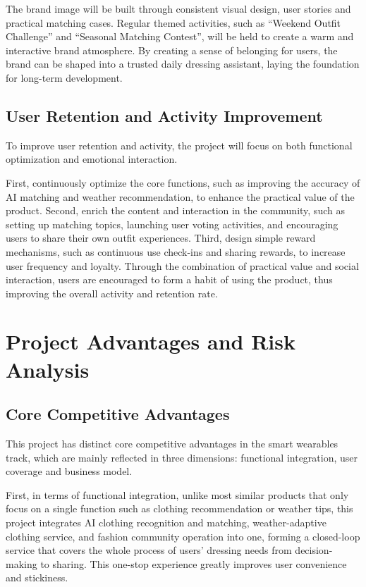 \documentclass[12pt,a4paper]{article}
\begin{document}
The brand image will be built through consistent visual design, user stories and practical matching cases. Regular themed activities, such as “Weekend Outfit Challenge” and “Seasonal Matching Contest”, will be held to create a warm and interactive brand atmosphere. By creating a sense of belonging for users, the brand can be shaped into a trusted daily dressing assistant, laying the foundation for long-term development.

\subsection{User Retention and Activity Improvement}
To improve user retention and activity, the project will focus on both functional optimization and emotional interaction.

First, continuously optimize the core functions, such as improving the accuracy of AI matching and weather recommendation, to enhance the practical value of the product. Second, enrich the content and interaction in the community, such as setting up matching topics, launching user voting activities, and encouraging users to share their own outfit experiences. Third, design simple reward mechanisms, such as continuous use check-ins and sharing rewards, to increase user frequency and loyalty. Through the combination of practical value and social interaction, users are encouraged to form a habit of using the product, thus improving the overall activity and retention rate.

\section{Project Advantages and Risk Analysis}
\subsection{Core Competitive Advantages}
This project has distinct core competitive advantages in the smart wearables track, which are mainly reflected in three dimensions: functional integration, user coverage and business model.

First, in terms of functional integration, unlike most similar products that only focus on a single function such as clothing recommendation or weather tips, this project integrates AI clothing recognition and matching, weather-adaptive clothing service, and fashion community operation into one, forming a closed-loop service that covers the whole process of users' dressing needs from decision-making to sharing. This one-stop experience greatly improves user convenience and stickiness.
\end{document}
